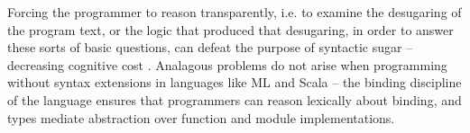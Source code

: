 \documentclass[acmsmall,10pt,review,anonymous]{acmart}\settopmatter{printfolios=true}
\begin{document}
Forcing the programmer to reason transparently, i.e. to examine the desugaring of the program text, or the logic that produced that desugaring, in order to answer these sorts of basic questions,  can defeat the purpose of syntactic sugar -- decreasing cognitive cost \cite{Green89}. Analagous problems do not arise when programming without syntax extensions in languages like ML and Scala -- the binding discipline of the language ensures that programmers can reason lexically about binding, and types mediate abstraction over function and module implementations.  %
\end{document}
